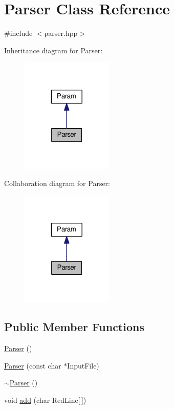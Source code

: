 \hypertarget{classParser}{\section{Parser Class Reference}
\label{classParser}
}


{\ttfamily \#include $<$parser.\-hpp$>$}



Inheritance diagram for Parser\-:\nopagebreak
\begin{figure}[H]
\begin{center}
\leavevmode
\includegraphics[width=124pt]{classParser__inherit__graph}
\end{center}
\end{figure}


Collaboration diagram for Parser\-:\nopagebreak
\begin{figure}[H]
\begin{center}
\leavevmode
\includegraphics[width=124pt]{classParser__coll__graph}
\end{center}
\end{figure}
\subsection*{Public Member Functions}
\begin{DoxyCompactItemize}
\item 
\hyperlink{classParser_a12234f6cd36b61af4b50c94a179422c1}{Parser} ()
\item 
\hyperlink{classParser_ae3012c947e9d131330b5cf510ba8bc2c}{Parser} (const char $\ast$Input\-File)
\item 
\hyperlink{classParser_a3e658b5917a93a3ef648050d060e3a93}{$\sim$\-Parser} ()
\item 
void \hyperlink{classParser_ae7099218e09ec122508491630f5f6ca0}{add} (char Red\-Line\mbox{[}$\,$\mbox{]})
\end{DoxyCompactItemize}
